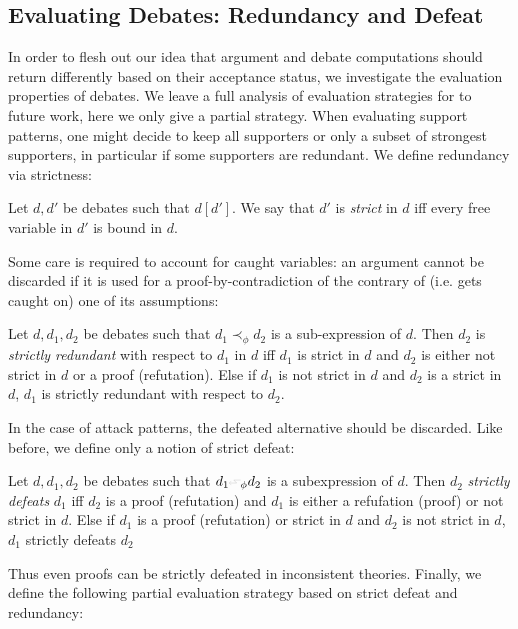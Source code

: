 \documentclass{IOS-Book-Article}
\begin{document}
\subsection{Evaluating Debates:  Redundancy and Defeat}\label{sec:eval-debat-redund}

In order to flesh out our idea that argument and debate computations should return differently based on their acceptance status, we investigate the evaluation properties of debates.
We leave a full analysis of evaluation strategies for \ACDC to future work, here we only give a partial strategy.
When evaluating support patterns, one might decide to keep all supporters or only a subset of strongest supporters, in particular if some supporters are redundant. We define redundancy via strictness:

\begin{definition}[Strictness]
  Let $d,d'$ be debates such that $d[d']$. We say that $d'$ is \emph{strict} in $d$ iff every free variable in $d'$ is bound in $d$.
\end{definition}

Some care is required to account for caught variables: an argument cannot be discarded if it is used for a proof-by-contradiction of the contrary of (i.e. gets caught on) one of its assumptions:

\begin{definition}
  Let $d,d_1,d_2$ be debates such that $d_1\prec_\phi d_2$ is a sub-expression of $d$. Then $d_2$ is \emph{strictly redundant} with respect to $d_1$ in $d$ iff $d_1$ is strict in $d$ and $d_2$ is either not strict in $d$ or a proof (refutation). Else if $d_1$ is not strict in $d$ and $d_2$ is a strict in $d$, $d_1$ is strictly redundant with respect to $d_2$.
\end{definition}

In the case of attack patterns, the defeated alternative should be discarded. Like before, we define only a notion of strict defeat:

\begin{definition}
  Let $d, d_1, d_2$ be debates such that $d_1\leftattack_\phi d_2$ is a subexpression of $d$. Then $d_2$ \emph{strictly defeats} $d_1$ iff $d_2$ is a proof (refutation) and $d_1$ is either a refufation (proof) or not strict in $d$. Else if $d_1$ is a proof (refutation) or strict in $d$  and $d_2$ is not strict in $d$, $d_1$ strictly defeats $d_2$
\end{definition}

Thus even proofs can be strictly defeated in inconsistent theories. Finally, we define the following partial evaluation strategy based on strict defeat and redundancy:
\end{document}
